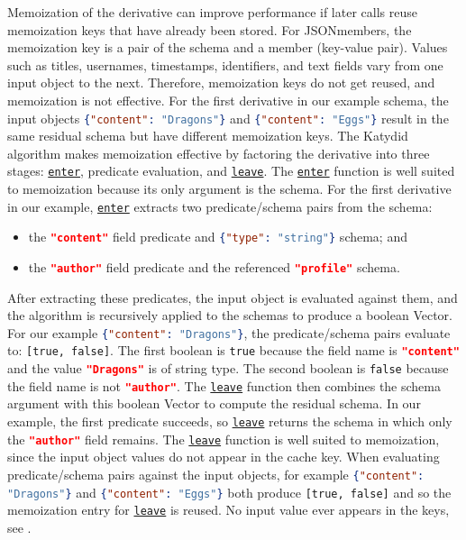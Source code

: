 \documentclass[acmsmall,%
  screen,%
  authorversion, %
  nonacm%
]{acmart}
\newcommand{\link}[2]{\mbox{\hyperref[#2]{\lstinline{#1}}}\xspace}
\newcommand{\enter}{\link{enter}{def enter}}
\newcommand{\leave}{\link{leave}{def leave}}
\begin{document}
Memoization of the derivative can improve performance if later calls reuse memoization keys that have already been stored. 
For JSONmembers, the memoization key is a pair of the schema and a member (key-value pair). 
Values such as titles, usernames, timestamps, identifiers, and text fields vary from one input object to the next. 
Therefore, memoization keys do not get reused, and memoization is not effective. 
For the first derivative in our example schema, the input objects \lstinline[language=json]|{"content": "Dragons"}| and \lstinline[language=json]|{"content": "Eggs"}| result in the same residual schema but have different memoization keys.
The Katydid algorithm makes memoization effective by factoring the derivative into three stages: \enter, predicate evaluation, and \leave. 
The \enter function is well suited to memoization because its only argument is the schema. 
For the first derivative in our example, \enter extracts two predicate/schema pairs from the schema:
\begin{itemize}
  \item the \lstinline[language=json]|"content"| field predicate and
  \lstinline[language=json]|{"type": "string"}| schema; and
  \item the \lstinline[language=json]|"author"| field predicate and the referenced \lstinline[language=json]|"profile"| schema.
\end{itemize}
After extracting these predicates, the input object is evaluated against them, and the algorithm is recursively applied to the schemas to produce a boolean Vector. 
For our example \lstinline[language=json]|{"content": "Dragons"}|, the predicate/schema pairs evaluate to: \lstinline{[true, false]}. 
The first boolean is \lstinline{true} because the field name is \lstinline[language=json]|"content"| and the value \lstinline[language=json]|"Dragons"| is of string type. 
The second boolean is \lstinline{false} because the field name is not \lstinline[language=json]|"author"|.
The \leave function then combines the schema argument with this boolean Vector to compute the residual schema. 
In our example, the first predicate succeeds, so \leave returns the schema in which only the \lstinline[language=json]|"author"| field remains.
The \leave function is well suited to memoization, since the input object values do not appear in the cache key.
When evaluating predicate/schema pairs against the input objects, for example \lstinline[language=json]|{"content": "Dragons"}| and \lstinline[language=json]|{"content": "Eggs"}| both produce \lstinline{[true, false]} and so the memoization entry for \leave is reused.
No input value ever appears in the keys, see .
\end{document}
